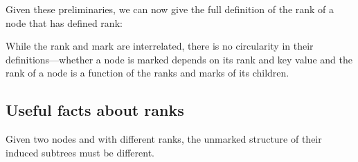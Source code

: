 Given these preliminaries, we can now give the full definition of the rank of a node that has defined rank:
\begin{fullonly}

\end{fullonly}
\begin{shortonly}

\end{shortonly}
While the rank and mark are interrelated, there is no circularity in their definitions---whether a node is marked depends on its rank and key value and the rank of a node is a function of the ranks and marks of its children. 



\subsection{Useful facts about ranks}

\begin{obs}
Given two nodes  and  with different ranks, the unmarked structure of their induced subtrees must be different.
\end{obs}


